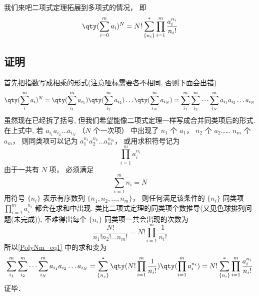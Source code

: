 

我们来吧二项式定理拓展到多项式的情况， 即
\begin{equation}
\qty(\sum_{i = 0}^m a_i)^N = N! \sum_{\{n_i\}}^* \prod_{i = 1}^m \frac{a_i^{n_i}}{n_i!}
\end{equation}

\subsection{证明}
首先把指数写成相乘的形式(注意哑标需要各不相同, 否则下面会出错)
\begin{equation}\label{PolyNm_eq1}
\qty(\sum_i^m a_i)^N = \qty(\sum_{i_1}^m a_{i_1})\qty(\sum_{i_2}^m a_{i_2})\dots \qty(\sum_{i_N}^m a_{i_N}) = \sum_{i_1}^m \sum_{i_2}^m\dots \sum_{i_N}^m a_{i_1} a_{i_2}\dots a_{i_N}
\end{equation}
虽然现在已经拆了括号, 但我们希望能像二项式定理一样写成合并同类项后的形式. 在上式中, 若 $a_{i_1} a_{i_2}\dots a_{i_N}$ （$N$ 个一次项） 中出现了 $n_1$ 个 $a_1$， $n_2$ 个 $a_2$…… $n_m$ 个 $a_m$， 则同类项可以记为 $a_1^{n_1} a_2^{n_2} \dots a_m^{n_m}$， 或用求积符号记为
\begin{equation}
\prod_{i=1}^m a_i^{n_i}
\end{equation}
由于一共有 $N$ 项， 必须满足
\begin{equation}
\sum_{i=1}^m n_i = N
\end{equation}
用符号 $\{n_i\}$ 表示有序数列 $\{n_1,n_2,\dots, n_m\}$， 则任何满足该条件的 $\{n_i\}$ 同类项 $\prod_{i=1}^m a_i^{n_i}$ 都会在求和中出现. 类比二项式定理的同类项个数推导(又见色球排列问题(未完成)), 不难得出每个 $\{n_i\}$ 同类项一共会出现的次数为
\begin{equation}
\frac{N!}{n_1! n_2!\dots n_m!} = N! \prod_{i=1}^m \frac{1}{n_i!}
\end{equation}
所以\autoref{PolyNm_eq1} 中的求和变为
\begin{equation}
\sum_{i_1}^m \sum_{i_2}^m\dots \sum_{i_N}^m a_{i_1} a_{i_2}\dots a_{i_N}
= \sum_{\{n_j\}}^* \qty(N! \prod_{i=1}^m \frac{1}{n_i!}) \qty(\prod_{i=1}^m a_i^{n_i})
= N! \sum_{\{n_i\}}^* \prod_{i=1}^m \frac{a_i^{n_i}}{n_i!}
\end{equation}
证毕．
